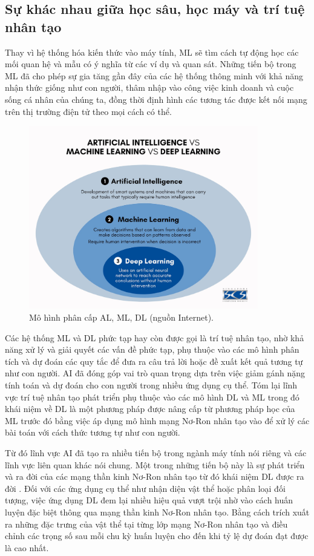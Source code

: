 \subsection{Sự khác nhau giữa học sâu, học máy và trí tuệ nhân tạo}


Thay vì hệ thống hóa kiến thức vào máy tính, ML sẽ tìm cách tự động học các mối quan hệ và mẫu có ý nghĩa từ các ví dụ và quan sát. Những tiến bộ trong ML đã cho phép sự gia tăng gần đây của các hệ thống thông minh với khả năng nhận thức giống như con người, thâm nhập vào công việc kinh doanh và cuộc sống cá nhân của chúng ta, đồng thời định hình các tương tác được kết nối mạng trên thị trường điện tử theo mọi cách có thể.

\begin{figure}[!h]
	\centering
	\includegraphics[width=100mm]{fig/AI_hierachical.jpg}
        \captionsetup{justification=centering}
	\caption{Mô hình phân cấp AL, ML, DL (nguồn Internet).}
	\label{fig_AL_hierachical}
\end{figure}

Các hệ thống ML và DL phức tạp hay còn được gọi là trí tuệ nhân tạo, nhờ khả năng xử lý và giải quyết các vấn đề phức tạp, phụ thuộc vào các mô hình phân tích và dự đoán các quy tắc để đưa ra câu trả lời hoặc đề xuất kết quả tương tự như con người. AI đã đóng góp vai trò quan trọng dựa trên việc giảm gánh nặng tính toán và dự đoán cho con người trong nhiều ứng dụng cụ thể. Tóm lại lĩnh vực trí tuệ nhân tạo phát triển phụ thuộc vào các mô hình DL và ML trong đó khái niệm về DL là một phương pháp được nâng cấp từ phương pháp học của ML trước đó bằng việc áp dụng mô hình mạng Nơ-Ron nhân tạo vào để xử lý các bài toán với cách thức tương tự như con người.

Từ đó lĩnh vực AI đã tạo ra nhiều tiến bộ trong ngành máy tính nói riêng và các lĩnh vực liên quan khác nói chung. Một trong những tiến bộ này là sự phát triển và ra đời của các mạng thần kinh Nơ-Ron nhân tạo từ đó khái niệm DL được ra đời \cite{janiesch2021machine}. Đối với các ứng dụng cụ thể như nhận diện vật thể hoặc phân loại đối tượng, việc ứng dụng DL đem lại nhiều hiệu quả vượt trội nhờ vào cách huấn luyện đặc biệt thông qua mạng thần kinh Nơ-Ron nhân tạo. Bằng cách trích xuất ra những đặc trưng của vật thể tại từng lớp mạng Nơ-Ron nhân tạo và điều chỉnh các trọng số sau mỗi chu kỳ huấn luyện cho đến khi tỷ lệ dự đoán đạt được là cao nhất.


